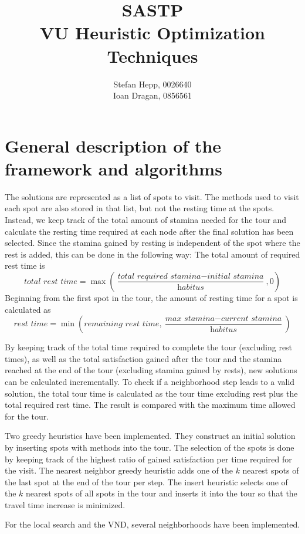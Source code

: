 \documentclass{article}
\title{SASTP \\
{VU Heuristic Optimization Techniques} }
\author{Stefan Hepp, 0026640 \\
Ioan Dragan, 0856561 }
\begin{document}
\maketitle
\section{General description of the framework and algorithms}

The solutions are represented as a list of spots to visit. The methods used to visit each spot are also stored in that list, but not the
resting time at the spots. Instead, we keep track of the total amount of stamina needed for the tour and calculate the resting time required 
at each node after the final solution has been selected. 
Since the stamina gained by resting is independent of the spot where the rest is added, this can be done in the following way: 
The total amount of required rest time is 
\[
\textit{total rest time} = \max\left(\frac{\textit{total required stamina} - \textit{initial stamina}}{\textit{habitus}},0\right)
\]
Beginning from the first spot in the tour, the amount of resting time for a spot is calculated as
\[
\textit{rest time} = \min\left(\textit{remaining rest time}, \frac{\textit{max stamina} - \textit{current stamina}}{\textit{habitus}}\right)
\]

By keeping track of the total time required to complete the tour (excluding rest times), as well as the total satisfaction gained after the tour and
the stamina reached at the end of the tour (excluding stamina gained by rests), new solutions can be calculated incrementally. 
To check if a neighborhood step leads to a valid solution, the total tour time is calculated as the tour time excluding rest plus
the total required rest time. The result is compared with the maximum time allowed for the tour.
\medskip

Two greedy heuristics have been implemented. They construct an initial solution by inserting spots with methods into the tour. The selection of the spots 
is done by keeping track of the highest ratio of gained satisfaction per time required for the visit.
The nearest neighbor greedy heuristic adds one of the $k$ nearest spots of the last spot at the end of the tour per step. The insert
heuristic selects one of the $k$ nearest spots of all spots in the tour and inserts it into the tour so that the travel time increase is minimized.
\medskip

For the local search and the VND, several neighborhoods have been implemented. 
\end{document}
